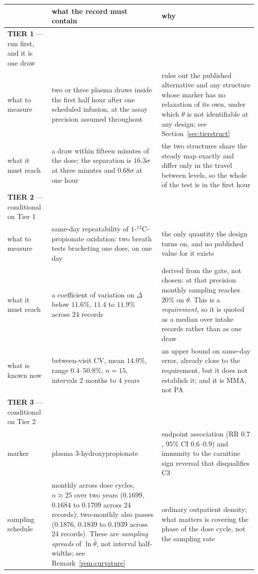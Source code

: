 \begin{tabular}{@{}>{\raggedright\arraybackslash}p{}@{\hskip 0.8em}>{\raggedright\arraybackslash}p{}@{\hskip 0.8em}>{\raggedright\arraybackslash}p{}@{}}
\toprule
\textbf{} & \textbf{what the record must contain} & \textbf{why} \\
\midrule
\textbf{TIER 1} --- run first, and it is one draw &  &  \\
what to measure & two or three plasma draws inside the first half hour after one scheduled infusion, at the assay precision assumed throughout & rules out the published alternative and any structure whose marker has no relaxation of its own, under which $\theta$ is not identifiable at any design; see Section~\ref{sec:tierstruct} \\
what it must reach & a draw within fifteen minutes of the dose; the separation is $16.3\sigma$ at three minutes and $0.68\sigma$ at one hour & the two structures share the steady map exactly and differ only in the travel between levels, so the whole of the test is in the first hour \\
\textbf{TIER 2} --- conditional on Tier 1 &  &  \\
what to measure & same-day repeatability of $1$-$^{13}$C-propionate oxidation: two breath tests bracketing one dose, on one day & the only quantity the design turns on, and no published value for it exists \\
what it must reach & a coefficient of variation on $\Delta$ below $11.6\%$, $11.4$ to $11.9$\% across 24 records & derived from the gate, not chosen: at that precision monthly sampling reaches $20\%$ on $\theta$. This is a \emph{requirement}, so it is quoted as a median over intake records rather than as one draw \\
what is known now & between-visit CV, mean $14.0\%$, range $0.4$--$50.8\%$, $n=15$, intervals $2$ months to $4$ years & an upper bound on same-day error, already close to the requirement, but it does not establish it; and it is MMA, not PA \\
\textbf{TIER 3} --- conditional on Tier 2 &  &  \\
marker & plasma 3-hydroxypropionate & endpoint association (RR $0.7$, $95\%$ CI $0.6$--$0.9$) and immunity to the carnitine sign reversal that disqualifies C3 \\
sampling schedule & monthly across dose cycles, $n \approx 25$ over two years ($0.1699$, $0.1684$ to $0.1709$ across 24 records); two-monthly also passes ($0.1876$, $0.1839$ to $0.1939$ across 24 records). These are \emph{sampling spreads} of $\ln\hat\theta$, not interval half-widths; see Remark~\ref{rem:curvature} & ordinary outpatient density; what matters is covering the phase of the dose cycle, not the sampling rate \\

\end{tabular}
